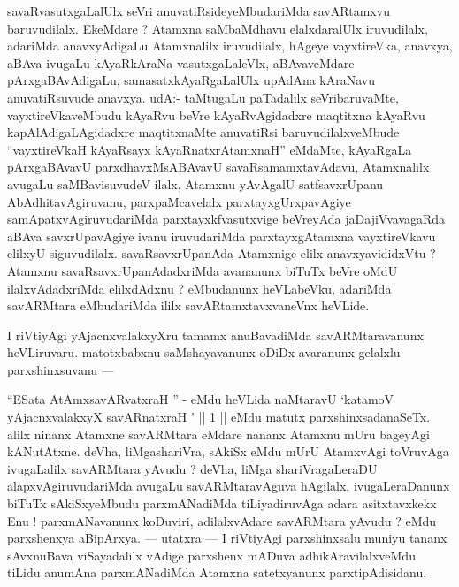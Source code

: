 \begin{artha}
savaRvasutxgaLalUlx seVri anuvatiRsideyeMbudariMda savARtamxvu baruvudilalx. EkeMdare ? Atamxna saMbaMdhavu elalxdaralUlx iruvudilalx, adariMda anavxyAdigaLu Atamxnalilx iruvudilalx, hAgeye vayxtireVka, anavxya, aBAva ivugaLu kAyaRkAraNa vasutxgaLaleVlx, aBAvaveMdare pArxgaBAvAdigaLu, samasatxkAyaRgaLalUlx upAdAna kAraNavu anuvatiRsuvude anavxya. udA:- taMtugaLu paTadalilx seVribaruvaMte, vayxtireVkaveMbudu kAyaRvu beVre kAyaRvAgidadxre maqtitxna kAyaRvu kapAlAdigaLAgidadxre maqtitxnaMte anuvatiRsi baruvudilalxveMbude ``vayxtireVkaH kAyaRsayx kAyaRnatxrAtamxnaH'' eMdaMte, kAyaRgaLa pArxgaBAvavU parxdhavxMsABAvavU savaRsamamxtavAdavu, Atamxnalilx avugaLu saMBavisuvudeV ilalx, Atamxnu yAvAgalU satfsavxrUpanu AbAdhitavAgiruvanu, parxpaMcavelalx parxtayxgUrxpavAgiye samApatxvAgiruvudariMda parxtayxkfvasutxvige beVreyAda jaDajiVvavagaRda aBAva savxrUpavAgiye ivanu iruvudariMda parxtayxgAtamxna vayxtireVkavu elilxyU siguvudilalx. savaRsavxrUpanAda Atamxnige elilx anavxyavididxVtu ? Atamxnu savaRsavxrUpanAdadxriMda avananunx biTuTx beVre oMdU ilalxvAdadxriMda elilxdAdxnu ? eMbudanunx heVLabeVku, adariMda savARMtara eMbudariMda ililx savARtamxtavxvaneVnx heVLide.
\end{artha}

\begin{artha}
I riVtiyAgi yAjacnxvalakxyXru tamamx anuBavadiMda savARMtaravanunx heVLiruvaru. matotxbabxnu saMshayavanunx oDiDx avaranunx gelalxlu parxshinxsuvanu ---
\end{artha}


\begin{artha}
``ESata AtAmxsavARvatxraH '' - eMdu heVLida naMtaravU `katamoV yAjacnxvalakxyX savARnatxraH ' || 1 || eMdu matutx parxshinxsadanaSeTx. alilx ninanx Atamxne savARMtara eMdare nananx Atamxnu mUru bageyAgi kANutAtxne. deVha, liMgashariVra, sAkiSx eMdu mUrU AtamxvAgi toVruvAga ivugaLalilx savARMtara yAvudu ? deVha, liMga shariVragaLeraDU alapxvAgiruvudariMda avugaLu savARMtaravAguva hAgilalx, ivugaLeraDanunx biTuTx sAkiSxyeMbudu parxmANadiMda tiLiyadiruvAga adara asitxtavxkekx Enu ! parxmANavanunx koDuviri, adilalxvAdare savARMtara yAvudu ? eMdu parxshenxya aBipArxya. --- utatxra --- I riVtiyAgi parxshinxsalu muniyu tananx sAvxnuBava viSayadalilx vAdige parxshenx mADuva adhikAravilalxveMdu tiLidu anumAna parxmANadiMda Atamxna satetxyanunx parxtipAdisidanu. 
\end{artha}

